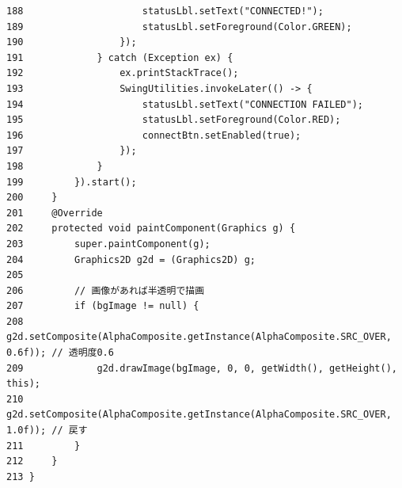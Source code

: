 \documentclass[11pt,a4j]{jarticle}
\begin{document}
\begin{small}
\begin{verbatim}
188                     statusLbl.setText("CONNECTED!");
189                     statusLbl.setForeground(Color.GREEN);
190                 });
191             } catch (Exception ex) {
192                 ex.printStackTrace();
193                 SwingUtilities.invokeLater(() -> {
194                     statusLbl.setText("CONNECTION FAILED");
195                     statusLbl.setForeground(Color.RED);
196                     connectBtn.setEnabled(true);
197                 });
198             }
199         }).start();
200     }
201     @Override
202     protected void paintComponent(Graphics g) {
203         super.paintComponent(g);
204         Graphics2D g2d = (Graphics2D) g;
205 
206         // 画像があれば半透明で描画
207         if (bgImage != null) {
208             g2d.setComposite(AlphaComposite.getInstance(AlphaComposite.SRC_OVER, 0.6f)); // 透明度0.6
209             g2d.drawImage(bgImage, 0, 0, getWidth(), getHeight(), this);
210             g2d.setComposite(AlphaComposite.getInstance(AlphaComposite.SRC_OVER, 1.0f)); // 戻す
211         }
212     }
213 }
\end{verbatim}
\end{small}
\end{document}
